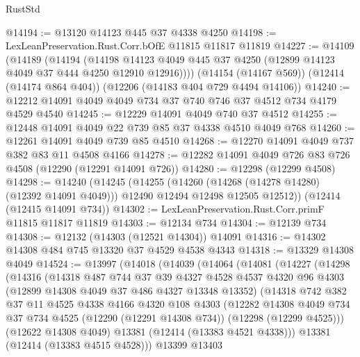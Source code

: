 \begin{lexlean}{RustStd}
\begin{coremodule}
@14194 := @13120 @14123 @445 @37 @4338 @4250
@14198 := LexLeanPreservation.Rust.Corr.bOfE @11815 @11817 @11819
@14227 := @14109
    (@14189
      (@14194
        (@14198 @14123 @4049 @445 @37 @4250 (@12899 @14123 @4049 @37 @444 @4250 @12910 @12916))))
    (@14154 (@14167 @569))
    (@12414 (@14174 @864 @404))
    (@12206 (@14183 @404 @729 @4494 @14106))
@14240 := @12212 @14091 @4049 @4049 @734 @37 @740 @746 @37 @4512 @734 @4179 @4529 @4540
@14245 := @12229 @14091 @4049 @740 @37 @4512
@14255 := @12448 @14091 @4049 @22 @739 @85 @37 @4338 @4510 @4049 @768
@14260 := @12261 @14091 @4049 @739 @85 @4510
@14268 := @12270 @14091 @4049 @737 @382 @83 @11 @4508 @4166
@14278 := @12282 @14091 @4049 @726 @83 @726 @4508 (@12290 (@12291 @14091 @726))
@14280 := @12298 (@12299 @4508)
@14298 := @14240
    (@14245
      (@14255
        (@14260 (@14268 (@14278 @14280) (@12392 @14091 @4049)))
        @12490
        @12494
        @12498
        @12505
        @12512))
    (@12414 (@12415 @14091 @734))
@14302 := LexLeanPreservation.Rust.Corr.primF @11815 @11817 @11819
@14303 := @12134 @734
@14304 := @12139 @734
@14308 := @12132 (@14303 (@12521 @14304)) @14091
@14316 := @14302 @14308 @484 @745 @13320 @37 @4529 @4538 @4343
@14318 := @13329 @14308 @4049
@14524 := @13997
    (@14018
      (@14039
        (@14064
          (@14081
            (@14227
              (@14298
                (@14316
                  (@14318
                    @487
                    @744
                    @37
                    @39
                    @4327
                    @4528
                    @4537
                    @4320
                    @96
                    @4303
                    (@12899 @14308 @4049 @37 @486 @4327 @13348 @13352)
                    (@14318
                      @742
                      @382
                      @37
                      @11
                      @4525
                      @4338
                      @4166
                      @4320
                      @108
                      @4303
                      (@12282
                        @14308
                        @4049
                        @734
                        @37
                        @734
                        @4525
                        (@12290 (@12291 @14308 @734))
                        (@12298 (@12299 @4525)))
                      (@12622 @14308 @4049)
                      @13381
                      (@12414 (@13383 @4521 @4338)))
                    @13381
                    (@12414 (@13383 @4515 @4528)))
                  @13399
                  @13403

\end{coremodule}
\end{lexlean}
